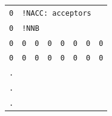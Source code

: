 {\begin{tabular}{r l l l l l l l l}
\texttt{0} & \multicolumn{8}{l}{\texttt{!NACC: acceptors}}\\
\texttt{0} & \multicolumn{8}{l}{\texttt{!NNB}}\\
\texttt{0} & \texttt{0} & \texttt{0} & \texttt{0} & \texttt{0} & \texttt{0} & \texttt{0} & \multicolumn{2}{l}{\texttt{0}}\\
\texttt{0} & \texttt{0} & \texttt{0} & \texttt{0} & \texttt{0} & \texttt{0} & \texttt{0} & \multicolumn{2}{l}{\texttt{0}}\\
\multicolumn{9}{l}{\texttt{.}}\\
\multicolumn{9}{l}{\texttt{.}}\\
\multicolumn{9}{l}{\texttt{.}}\\
\end{tabular}
}\\\\
